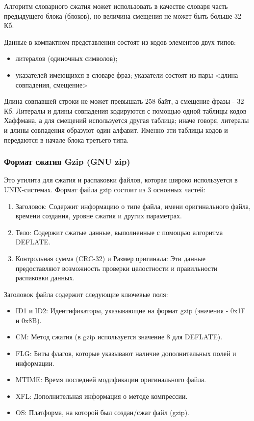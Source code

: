 \documentclass[12pt]{article}
\begin{document}
Алгоритм словарного сжатия может использовать в качестве словаря часть предыдущего блока
(блоков), но величина смещения не может быть больше 32 Кб.

Данные в компактном представлении состоят из кодов элементов двух типов:

\begin{itemize}[label=-]
    \item литералов (одиночных символов);
    \item указателей имеющихся в словаре фраз; указатели состоят из пары
          <длина совпадения, смещение>
\end{itemize}

Длина совпавшей строки не может превышать 258 байт, а смещение фразы - 32 Кб.
Литералы и длины совпадения кодируются с помощью одной таблицы кодов Хаффмана,
а для смещений используется другая таблица; иначе говоря,
литералы и длины совпадения образуют один алфавит.
Именно эти таблицы кодов и передаются в начале блока третьего типа.

\subsubsection{Формат сжатия Gzip (GNU zip)}

Это утилита для сжатия и распаковки файлов, которая широко используется в UNIX-системах.
Формат файла gzip состоит из 3 основных частей:

\begin{enumerate}
    \item Заголовок: Содержит информацию о типе файла, имени оригинального файла, времени создания, уровне сжатия и других параметрах.
    \item Тело: Содержит сжатые данные, выполненные с помощью алгоритма DEFLATE.
    \item Контрольная сумма (CRC-32) и Размер оригинала: Эти данные предоставляют возможность проверки целостности и правильности распаковки данных.
\end{enumerate}

Заголовок файла содержит следующие ключевые поля:

\begin{itemize}[label=-]
    \item ID1 и ID2: Идентификаторы, указывающие на формат gzip (значения - 0x1F и 0x8B).
    \item CM: Метод сжатия (в gzip используется значение 8 для DEFLATE). \*
    \item FLG: Биты флагов, которые указывают наличие дополнительных полей и информации.
    \item MTIME: Время последней модификации оригинального файла.
    \item XFL: Дополнительная информация о методе компрессии.
    \item OS: Платформа, на которой был создан/сжат файл (gzip).
\end{itemize}
\end{document}
